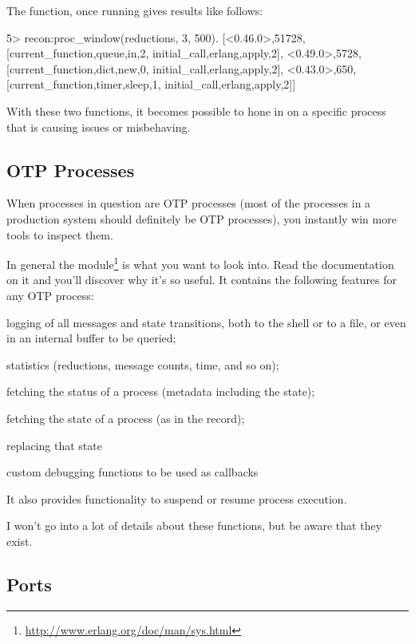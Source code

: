 \documentclass[11pt, oneside]{book}   	%
\begin{document}
The function, once running gives results like follows:

\begin{VerbatimEshell}
5> recon:proc_window(reductions, 3, 500).
[{<0.46.0>,51728,
  [{current_function,{queue,in,2}},
   {initial_call,{erlang,apply,2}}]},
 {<0.49.0>,5728,
  [{current_function,{dict,new,0}},
   {initial_call,{erlang,apply,2}}]},
 {<0.43.0>,650,
  [{current_function,{timer,sleep,1}},
   {initial_call,{erlang,apply,2}}]}]
\end{VerbatimEshell}

With these two functions, it becomes possible to hone in on a specific process that is causing issues or misbehaving.


\subsection{OTP Processes}

When processes in question are OTP processes (most of the processes in a production system should definitely be OTP processes), you instantly win more tools to inspect them.

In general the  module\footnote{\href{http://www.erlang.org/doc/man/sys.html}{http://www.erlang.org/doc/man/sys.html}} is what you want to look into. Read the documentation on it and you'll discover why it's so useful. It contains the following features for any OTP process:

\begin{itemize*}
	\item logging of all messages and state transitions, both to the shell or to a file, or even in an internal buffer to be queried;
	\item statistics (reductions, message counts, time, and so on);
	\item fetching the status of a process (metadata including the state);
	\item fetching the state of a process (as in the  record);
	\item replacing that state
	\item custom debugging functions to be used as callbacks
\end{itemize*}

It also provides functionality to suspend or resume process execution.

I won't go into a lot of details about these functions, but be aware that they exist.

\subsection{Ports}
\end{document}
